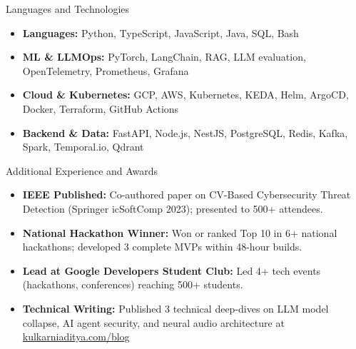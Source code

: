 \documentclass[]{mcdowellcv}
\begin{document}
\begin{cvsection}{Languages and Technologies}
  \begin{cvsubsection}{}{}{}
    \begin{itemize}
      \item \textbf{Languages:} Python, TypeScript, JavaScript, Java, SQL, Bash
      \item \textbf{ML \& LLMOps:} PyTorch, LangChain, RAG, LLM evaluation, OpenTelemetry, Prometheus, Grafana
      \item \textbf{Cloud \& Kubernetes:} GCP, AWS, Kubernetes, KEDA, Helm, ArgoCD, Docker, Terraform, GitHub Actions
      \item \textbf{Backend \& Data:} FastAPI, Node.js, NestJS, PostgreSQL, Redis, Kafka, Spark, Temporal.io, Qdrant
    \end{itemize}
  \end{cvsubsection}
\end{cvsection}

\begin{cvsection}{Additional Experience and Awards}
  \begin{cvsubsection}{}{}{}
    \begin{itemize}
      \item \textbf{IEEE Published:} Co-authored paper on CV-Based Cybersecurity Threat Detection (Springer icSoftComp 2023); presented to 500+ attendees.
      \item \textbf{National Hackathon Winner:} Won or ranked Top 10 in 6+ national hackathons; developed 3 complete MVPs within 48-hour builds.
      \item \textbf{Lead at Google Developers Student Club:} Led 4+ tech events (hackathons, conferences) reaching 500+ students.
      \item \textbf{Technical Writing:} Published 3 technical deep-dives on LLM model collapse, AI agent security, and neural audio architecture at \href{https://www.kulkarniaditya.com/blog}{kulkarniaditya.com/blog}
    \end{itemize}
  \end{cvsubsection}
\end{cvsection}
\end{document}
